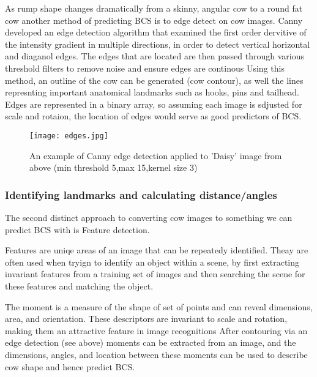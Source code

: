 \documentclass[11pt]{article}
\begin{document}
	As rump shape changes dramatically from a skinny, angular cow to a round fat cow another method of predicting BCS is to edge detect on cow images.
	Canny developed an edge detection algorithm that examined the first order dervitive of the intensity gradient in multiple directions, in order to detect vertical horizontal and diaganol edges\cite{Canny1986}.
	The edges that are located are then passed through various threshold filters to remove noise and ensure edges are continous
	Using this method, an outline of the cow can be generated (cow contour), as well the lines represnting important anatomical landmarks such as hooks, pins and tailhead.
	Edges are represented in a binary array, so assuming each image is sdjusted for scale and rotaion, the location of edges would serve as good predictors of BCS.


	\begin{figure}[h!]
		\centering
		\texttt{[image: edges.jpg]}
		\caption{An example of Canny edge detection applied to 'Daisy' image from above (min threshold 5,max 15,kernel size 3) }
		\label{fig:<+label+>}
	\end{figure}
\newpage


	\subsubsection{Identifying landmarks and calculating distance/angles}

	The second distinct approach to converting cow images to something we can predict BCS with is Feature detection.


	Features are uniqe areas of an image that can be repeatedy identified.
	Theay are often used when tryign to identify an object within a scene, by first extracting invariant features from a training set of images and then searching the scene for these features and matching the object.


	The moment is a measure of the shape of set of points and can reveal dimensions, area, and orientation. 
	These descriptors are invariant to scale and rotation, making them an attractive feature in image recognitions
	After contouring via an edge detection (see above) moments can be extracted from an image, and the dimensions, angles, and location between these moments can be used to describe cow shape and hence predict BCS.
\end{document}
